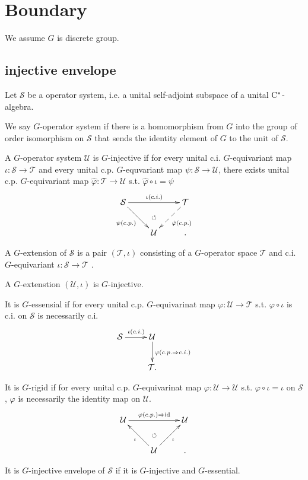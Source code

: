 \section{Boundary}
We assume $G$ is discrete group.
\subsection{injective envelope}
\begin{definition}
  Let $\mathcal{S}$ be a operator system, i.e. a unital self-adjoint subspace of a unital $\rm{C}^*$-algebra.
  
  We say $G$-operator system if there is a homomorphism from $G$ into the group of order isomorphism on $\mathcal{S}$ that sends the identity element of $G$ to the unit of $\mathcal{S}$.
  
  A $G$-operator system $\mathcal{U}$ is $G$-injective if for every unital c.i. $G$-equivariant map $\iota : \mathcal{S} \rightarrow \mathcal{T}$ and
  every unital c.p. $G$-equvariant map $\psi : \mathcal{S} \rightarrow \mathcal{U}$,
  there exists unital c.p. $G$-equivariant map $\hat{\varphi} : \mathcal{T} \rightarrow \mathcal{U}$ s.t. $\hat{\varphi} \circ \iota = \psi$
  \[
  \xymatrix{
    \mathcal{S} \ar[rr]^{\iota(c.i.)} \ar[dr]_{\psi(c.p.)} &\ar@{}[d]|\circlearrowleft &\mathcal{T} \ar@{-->}[dl]^{\hat{\varphi}(c.p.)} \\
    &\mathcal{U}& .
  }
  \]
  
  A $G$-extension of $\mathcal{S}$ is a pair $(\mathcal{T},\iota)$ consisting of a $G$-operator space $\mathcal{T}$ and c.i. $G$-equivariant $\iota : \mathcal{S} \rightarrow \mathcal{T}$ .

  A $G$-extenstion $(\mathcal{U},\iota)$ is $G$-injective.

  It is $G$-essensial if for every unital c.p. $G$-equivarinat map $\varphi: \mathcal{U} \rightarrow \mathcal{T}$ s.t. $\varphi \circ \iota$ is c.i. on $\mathcal{S}$ is necessarily c.i.
  \[
  \xymatrix{
    \mathcal{S} \ar[r]^{\iota(c.i.)}&\mathcal{U} \ar[d]^{\varphi(c.p.\Rightarrow c.i.)} \\
    & \mathcal{T}.
  }
  \]

  It is $G$-rigid if for every unital c.p. $G$-equivarinat map $\varphi : \mathcal{U} \rightarrow \mathcal{U}$ s.t. $ \varphi \circ \iota = \iota$ on $\mathcal{S}$, $\varphi$ is necessarily the identity map on $\mathcal{U}$.
  \[
  \xymatrix{
    \mathcal{U} \ar[rr]^{\varphi (c.p.) \Rightarrow \rm{id}} &\ar@{}[d]|\circlearrowleft &\mathcal{U} \\
    &\mathcal{U} \ar[lu]^{\iota} \ar[ur]_\iota& .
  }
  \]

  It is $G$-injective envelope of $\mathcal{S}$ if it is $G$-injective and $G$-essential.
\end{definition}

